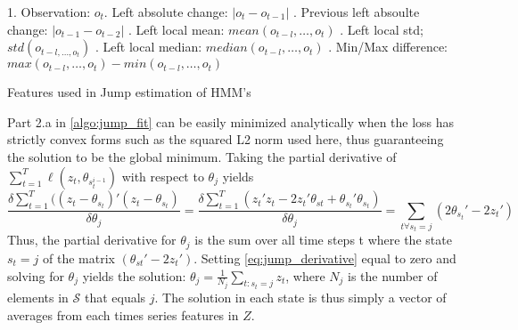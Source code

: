 \begin{algorithm}[H]

\BlankLine

1. Observation: $o_t$. Left absolute change: $|o_t-o_{t-1}|$ . Previous left absoulte change: $|o_{t-1}-o_{t-2}|$ . Left local mean: $mean(o_{t-l},\ldots,o_{t})$ . Left local std; $std(o_{t-l,\ldots, o_{t}})$ . Left local median: $median(o_{t-l},\ldots,o_{t})$ . Min/Max difference: $max(o_{t-l},\ldots,o_{t}) - min(o_{t-l},\ldots,o_{t})$ \;
\BlankLine



\caption{Features used in Jump estimation of HMM's}
\label{algo:jump_features}
\end{algorithm}

Part 2.a in \cref{algo:jump_fit} can be easily minimized analytically when the loss has strictly convex forms such as the squared L2 norm used here, thus guaranteeing the solution to be the global minimum. Taking the partial derivative of $\sum_{t=1}^T \ell(z_t, \theta_{s_t^{i-1}})$ with respect to $\theta_j$ yields
\begin{equation}
   \frac{\delta \sum_{t=1}^{T} ((z_t-\theta_{s_t})'(z_t-\theta_{s_t}) }{\delta \theta_j}
   = \frac{\delta \sum_{t=1}^T (z_t'z_t - 2z_t'\theta_{st}+ \theta_{s_t}'\theta_{s_t} )}{\delta  \theta_j}
   = \sum_{t\forall s_t=j} ( 2\theta_{s_t}' - 2z_t' )
\label{eq:jump_derivative}
\end{equation}
Thus, the partial derivative for $\theta_j$ is the sum over all time steps t where the state $s_t=j$ of the matrix $(\theta_{st}'-2z_t')$. Setting \cref{eq:jump_derivative} equal to zero and solving for $\theta_j$ yields the solution: $\theta_j = \frac{1}{N_j} \sum_{t:s_t=j} z_t $, where $N_j$ is the number of elements in $\mathcal{S}$ that equals $j$. The solution in each state is thus simply a vector of averages from each times series features in $Z$.

